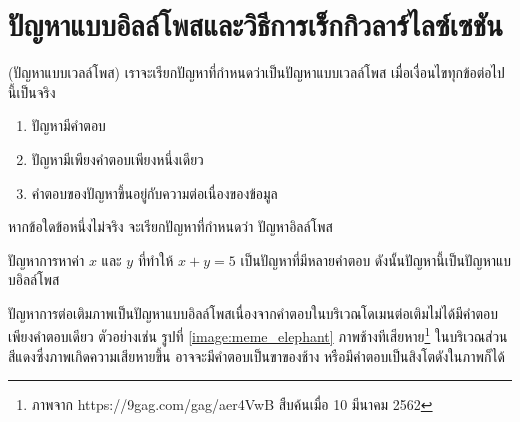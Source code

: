\section{ปัญหาแบบอิลล์โพสและวิธีการเร็กกิวลาร์ไลซ์เซชัน}

\begin{Definition}
    (ปัญหาแบบเวลล์โพส) เราจะเรียกปัญหาที่กำหนดว่าเป็นปัญหาแบบเวลล์โพส เมื่อเงื่อนไขทุกข้อต่อไปนี้เป็นจริง
    \begin{enumerate}
        \item ปัญหามีคำตอบ
        \item ปัญหามีเพียงคำตอบเพียงหนึ่งเดียว
        \item คำตอบของปัญหาขึ้นอยู่กับความต่อเนื่องของข้อมูล
    \end{enumerate}    
    หากข้อใดข้อหนึ่งไม่จริง จะเรียกปัญหาที่กำหนดว่า ปัญหาอิลล์โพส
\end{Definition}


\begin{Example}
    ปัญหาการหาค่า $x$ และ $y$ ที่ทำให้ $x+y = 5$ เป็นปัญหาที่มีหลายคำตอบ ดังนั้นปัญหานี้เป็นปัญหาแบบอิลล์โพส
    \label{example:x_plus_y_5}
\end{Example}

\hspace{1cm} ปัญหาการต่อเติมภาพเป็นปัญหาแบบอิลล์โพสเนื่องจากคำตอบในบริเวณโดเมนต่อเติมไม่ได้มีคำตอบเพียงคำตอบเดียว ตัวอย่างเช่น รูปที่ \ref{image:meme_elephant} ภาพช้างทีเสียหาย\footnote{ภาพจาก https://9gag.com/gag/aer4VwB สืบค้นเมื่อ 10 มีนาคม 2562} ในบริเวณส่วนสีแดงซึ่งภาพเกิดความเสียหายขึ้น อาจจะมีคำตอบเป็นขาของช้าง หรือมีคำตอบเป็นสิงโตดังในภาพก็ได้

